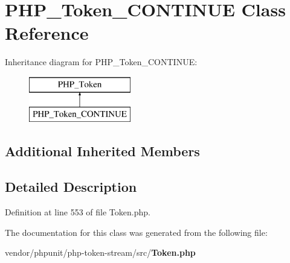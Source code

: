 \section{P\+H\+P\+\_\+\+Token\+\_\+\+C\+O\+N\+T\+I\+N\+U\+E Class Reference}
\label{class_p_h_p___token___c_o_n_t_i_n_u_e}
Inheritance diagram for P\+H\+P\+\_\+\+Token\+\_\+\+C\+O\+N\+T\+I\+N\+U\+E\+:\begin{figure}[H]
\begin{center}
\leavevmode
\includegraphics[height=2.000000cm]{class_p_h_p___token___c_o_n_t_i_n_u_e}
\end{center}
\end{figure}
\subsection*{Additional Inherited Members}


\subsection{Detailed Description}


Definition at line 553 of file Token.\+php.



The documentation for this class was generated from the following file\+:\begin{DoxyCompactItemize}
\item 
vendor/phpunit/php-\/token-\/stream/src/{\bf Token.\+php}\end{DoxyCompactItemize}
